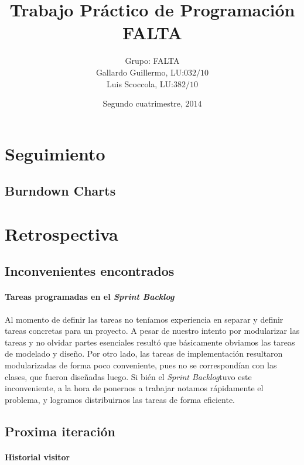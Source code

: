 \documentclass{article}
\newcommand{\prodback}{\textit{Product Backlog}}
\newcommand{\sprintback}{\textit{Sprint Backlog}}
\begin{document}
  \title{Trabajo Pr\'actico de Programaci\'on FALTA}
  \date{Segundo cuatrimestre, $2014$}
  \author{Grupo: FALTA \\ Gallardo Guillermo, LU:$032/10$\\ Luis Scoccola, LU:$382/10$}

  \maketitle
 
  \newpage

  

  

  \section{Seguimiento}
    \subsection{Burndown Charts}

  

  \section{Retrospectiva}
    \subsection{Inconvenientes encontrados}
    \paragraph{Tareas programadas en el \sprintback}
    Al momento de definir las tareas no ten\'iamos experiencia en separar y definir
    tareas concretas para un proyecto. A pesar de nuestro intento por modularizar
    las tareas y no olvidar partes esenciales result\'o que b\'asicamente obviamos
    las tareas de modelado y dise\~no. Por otro lado, las tareas de implementaci\'on
    resultaron modularizadas de forma poco conveniente, pues no se correspond\'ian
    con las clases, que fueron dise\~nadas luego. Si bi\'en el \sprintback tuvo
    este inconveniente, a la hora de ponernos a trabajar notamos r\'apidamente
    el problema, y logramos distribuirnos las tareas de forma eficiente.

    \subsection{Proxima iteraci\'on}

    \paragraph{Historial visitor}
\end{document}
